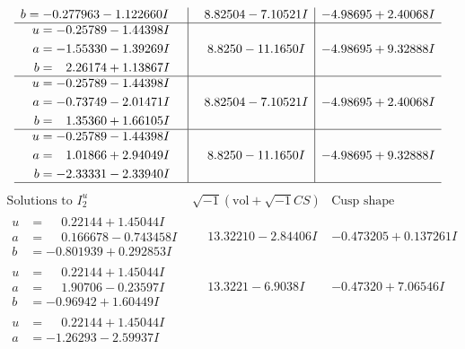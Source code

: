 \documentclass[1p]{elsarticle_modified}
\theoremstyle{definition}
\newcommand{\I}{\sqrt{-1}}
\begin{document}
$$\begin{array}{c|c|c}
\begin{aligned}
b &= -0.277963 - 1.122660 I\end{aligned}
 & \phantom{-}8.82504 - 7.10521 I & -4.98695 + 2.40068 I \\ \hline\begin{aligned}
u &= -0.25789 - 1.44398 I \\
a &= -1.55330 - 1.39269 I \\
b &= \phantom{-}2.26174 + 1.13867 I\end{aligned}
 & \phantom{-}8.8250 - 11.1650 I & -4.98695 + 9.32888 I \\ \hline\begin{aligned}
u &= -0.25789 - 1.44398 I \\
a &= -0.73749 - 2.01471 I \\
b &= \phantom{-}1.35360 + 1.66105 I\end{aligned}
 & \phantom{-}8.82504 - 7.10521 I & -4.98695 + 2.40068 I \\ \hline\begin{aligned}
u &= -0.25789 - 1.44398 I \\
a &= \phantom{-}1.01866 + 2.94049 I \\
b &= -2.33331 - 2.33940 I\end{aligned}
 & \phantom{-}8.8250 - 11.1650 I & -4.98695 + 9.32888 I\\
 \hline 
 \end{array}$$\newpage$$\begin{array}{c|c|c}  
\text{Solutions to }I^u_{2}& \I (\text{vol} + \sqrt{-1}CS) & \text{Cusp shape}\\
 \hline 
\begin{aligned}
u &= \phantom{-}0.22144 + 1.45044 I \\
a &= \phantom{-}0.166678 - 0.743458 I \\
b &= -0.801939 + 0.292853 I\end{aligned}
 & \phantom{-}13.32210 - 2.84406 I & -0.473205 + 0.137261 I \\ \hline\begin{aligned}
u &= \phantom{-}0.22144 + 1.45044 I \\
a &= \phantom{-}1.90706 - 0.23597 I \\
b &= -0.96942 + 1.60449 I\end{aligned}
 & \phantom{-}13.3221 - 6.9038 I & -0.47320 + 7.06546 I \\ \hline\begin{aligned}
u &= \phantom{-}0.22144 + 1.45044 I \\
a &= -1.26293 - 2.59937 I \\

\end{aligned}
\end{array}$$
\end{document}
